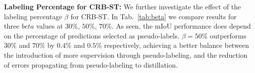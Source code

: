 \documentclass[10pt,twocolumn,letterpaper]{article}
\begin{document}
\noindent \textbf{Labeling Percentage for CRB-ST:} We further investigate the effect of the labeling percentage $\beta$ for CRB-ST. In Tab.~\ref{tab:beta} we compare results for three $beta$ values at $30\%$, $50\%$, $70\%$. As seen, the mIoU performance does depend on the percentage of predictions selected as pseudo-labels. $\beta=50\%$ outperforms $30\%$ and $70\%$ by $0.4\%$ and $0.5\%$ respectively, achieving a better balance between the introduction of more supervision through pseudo-labeling, and the reduction of errors propagating from pseudo-labeling to distillation.

\begin{table}[t]
        \centering
        \tabcolsep=0.11cm
        \caption{Investigating the effect of $\beta$ for CRB-ST.}
        \label{tab:beta}
\end{table}
\end{document}
